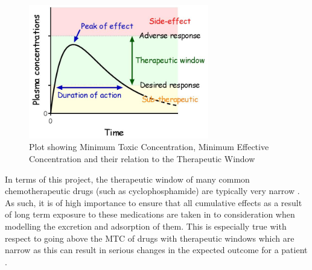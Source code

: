 \begin{figure}[h]
	\centering
	\includegraphics[width=0.7\textwidth]{Images/therapeutic-window.jpg}
	\caption{Plot showing Minimum Toxic Concentration, Minimum Effective Concentration and their relation to the Therapeutic Window \cite{Therapeutic_Index_And_Window}}
    \label{fig:theraputic_window}
\end{figure}

	
In terms of this project, the therapeutic window of many common chemotherapeutic drugs (such as cyclophosphamide) are typically very narrow \cite{cyclophosphamide_details}. As such, it is of high importance to ensure that all cumulative effects as a result of long term exposure to these medications are taken in to consideration when modelling the excretion and adsorption of them. This is especially true with respect to going above the MTC of drugs with therapeutic windows which are narrow as this can result in serious changes in the expected outcome for a patient \cite{Clinical_Pharmacokinetics_and_Pharmacodynamics_Concepts}.


